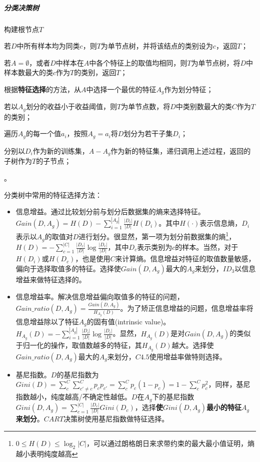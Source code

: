 \subparagraph{分类决策树}
\begin{myenumerate}
\item 构建根节点$T$
\item 若$D$中所有样本均为同类$c$，则$T$为单节点树，并将该结点的类别设为$c$，返回$T$；
\item 若$A = \emptyset$，或者$D$中样本在$A$中各个特征上的取值均相同，则$T$为单节点树，将$D$中样本数最大的类$c$作为$T$的类别，返回$T$；
\item 根据\textbf{特征选择}的方法，从$A$中选择一个最优的特征$A_g$作为划分特征；
\item 若以$A_g$划分的收益小于收益阈值，则$T$为单节点数，将$D$中类别数最大的类$C$作为$T$的类别；
\item 遍历$A_g$的每一个值$a_i$，按照$A_g = a_i$将$D$划分为若干子集$D_i$；
\item 分别以$D_i$作为新的训练集，$A - {A_g}$作为新的特征集，递归调用上述过程，返回的子树作为$T$的子节点；
\end{myenumerate}

。

分类树中常用的特征选择方法：
\begin{itemize}
\item 信息增益。通过比较划分前与划分后数据集的熵来选择特征。$Gain(D, A_g) = H(D) - \sum_{i=1}^{|A_g|} \frac{|D_i|}{|D|} H(D_i)$。其中$H(\cdot)$表示信息熵，$D_i$表示以$A_g$的取值对$D$进行划分。很显然，第一项为划分前数据集的熵\footnote{$0 \leq H(D) \leq \log_2 |C|$，可以通过朗格朗日来求带约束的最大最小值证明，熵越小表明纯度越高}，$H(D) = -\sum_{c=1}^{|C|} \frac{|D_c|}{|D|} \log \frac{|D_c|}{|D|}$，其中$D_c$表示类别为$c$的样本。当然，对于$H(D_i)$或$H(D_c)$，也是使用$C$来计算熵。信息增益对特征的取值数量敏感，偏向于选择取值多的特征。选择使$Gain(D, A_g)$最大的$A_g$来划分，$ID_3$以信息增益来做特征选择的。
\item 信息增益率。解决信息增益偏向取值多的特征的问题，$Gain\_ratio(D, A_g) = \frac{Gain(D, A_g)}{H_{A_g}(D)}$。为了矫正信息增益的问题，信息增益率将信息增益除以了特征$A_g$的固有值(intrinsic value)。$H_{A_g}(D) = -\sum_{i=1}^{|A_g|} \frac{|D_i|}{|D|} \log \frac{|D_i|}{|D|}$。显然，$H_{A_g}(D)$是对$Gain(D, A_g)$的类似于归一化的操作，取值数越多的特征，其$H_{A_g}(D)$越大。选择使$Gain\_ratio(D, A_g)$最大的$A_g$来划分，$C4.5$使用增益率做特则选择。
\item 基尼指数。$D$的基尼指数为$Gini(D) = \sum_{c}^{C} \sum_{c' \neq c}^{C} p_c p_{c'} = \sum_{c}^{C} p_c (1 - p_c) = 1 - \sum_{c}^{C} p_c^2$，同样，基尼指数越小，纯度越高/不确定性越低。$D$在$A_g$下的基尼指数$Gini(D, A_g) = \sum_{c=1}^{|C|} \frac{|D_c|}{|D|} Gini(D_c)$，选择\textbf{使$Gini(D, A_g)$最小的特征$A_g$来划分}。$CART$决策树使用基尼指数做特征选择。
\end{itemize}

